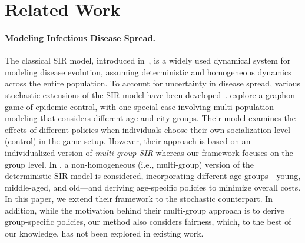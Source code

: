 \section{Related Work}
\paragraph{Modeling Infectious Disease Spread.} 
The classical SIR model, introduced in~\cite{kermack1927contribution}, is a widely used dynamical system for modeling disease evolution, assuming deterministic and homogeneous dynamics across the entire population. To account for uncertainty in disease spread, various stochastic extensions of the SIR model have been developed~\citep{bartlett1956deterministic,bailey1975mathematical,beretta1998stability,andersson2012stochastic,britton2010stochastic,kiss2017mathematics,cai2015stochastic,cai2017stochastic,karako2020analysis,martcheva2015introduction,allen2017primer,britton2019stochastic,zhou2021ergodic,laaribi2023generalized,greenwood2009stochastic}. \cite{Aurell_Carmona_Dayanıklı_Lauriere_2022b} explore a graphon game of epidemic control, with one special case involving multi-population modeling that considers different age and city groups. Their model examines the effects of different policies when individuals choose their own socialization level (control) in the game setup. However, their approach is based on an individualized version of \textit{multi-group SIR} whereas our framework focuses on the group level. In \cite{acemoglu2021optimal}, a non-homogeneous (i.e., multi-group) version of the deterministic SIR model is considered, incorporating different age groups---young, middle-aged, and old---and deriving age-specific policies to minimize overall costs. In this paper, we extend their framework to the stochastic counterpart. In addition, while the motivation behind their multi-group approach is to derive group-specific policies, our method also considers fairness, which, to the best of our knowledge, has not been explored in existing work.
 
